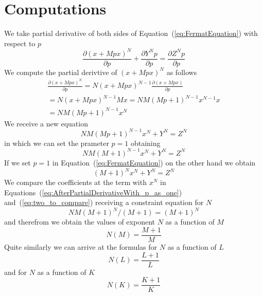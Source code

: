 \documentclass[12pt]{article}
\numberwithin{equation}{section}
\begin{document}
\section{Computations}\label{sec:computations}

We take partial derivative of both sides of Equation~(\ref{eq:FermatEquation}) with respect to $p$ 
\begin{equation}
\label{eq:FermatEquationTakingDerivative}
\frac{\partial (x + Mpx)^N}{\partial p} + \frac{\partial Y^N p}{\partial p} = \frac{\partial Z^N p}{\partial p}
\end{equation}
We compute the partial derivtive of $(x + Mpx)^N$ as follows
\begin{eqnarray}
\frac{\partial (x + Mpx)^N}{\partial p}
=
N(x + Mpx)^{N-1}  \frac{\partial (x + Mpx)}{\partial p}   \\ \nonumber
=
N(x + Mpx)^{N-1} Mx 
=
NM  (Mp+1)^{N-1} x^{N-1}  x     \\  \nonumber
=
NM  (Mp+1)^{N-1}  x^N
\end{eqnarray}
We receive a new equation
\begin{equation}
NM  (Mp+1)^{N-1}  x^N + Y^{N} = Z^{N}
\end{equation}
in which we can set the prameter $p=1$ obtaining
\begin{equation}
\label{eq:AfterPartialDerivativeWith_p_as_one}
NM  (M+1)^{N-1}  x^N + Y^{N} = Z^{N}
\end{equation}
If we set $p=1$ in Equation~(\ref{eq:FermatEquation}) on the other hand we obtain
\begin{equation}
\label{eq:two_to_compare}
(M+1)^{N} x^{N} + Y^N  = Z^N
\end{equation}
We compare the coefficients at the term with $x^{N}$ in Equations~(\ref{eq:AfterPartialDerivativeWith_p_as_one}) 
and~(\ref{eq:two_to_compare})
receiving a constraint equation for $N$
\begin{equation}
\label{eq:constraint_for_N}
NM(M+1)^{N}/(M+1) = (M+1)^{N}
\end{equation}
and therefrom we obtain the values of exponent $N$ as a function of $M$
\begin{equation}
  \label{eq:constraintNM}
  N(M) = \frac{M+1}{M}
\end{equation}
Quite similarly we can arrive at the formulas for $N$ as a function of $L$
\begin{equation}
  \label{eq:constraintNL}
  N(L) = \frac{L+1}{L}
\end{equation}
and for $N$ as a function of $K$
\begin{equation}
   \label{eq:constraintNK}
  N(K) = \frac{K+1}{K}
\end{equation}
\end{document}
